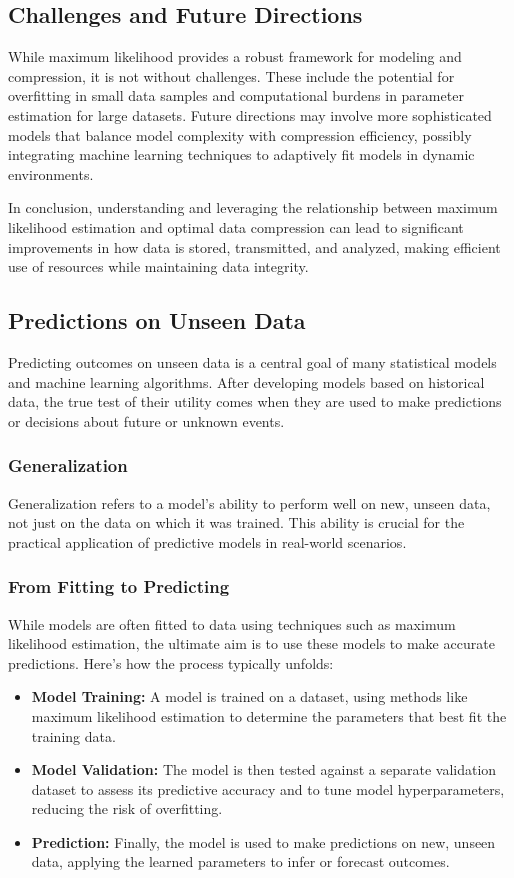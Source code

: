 \subsection{Challenges and Future Directions}
While maximum likelihood provides a robust framework for modeling and compression, it is not without challenges. These include the potential for overfitting in small data samples and computational burdens in parameter estimation for large datasets. Future directions may involve more sophisticated models that balance model complexity with compression efficiency, possibly integrating machine learning techniques to adaptively fit models in dynamic environments.

In conclusion, understanding and leveraging the relationship between maximum likelihood estimation and optimal data compression can lead to significant improvements in how data is stored, transmitted, and analyzed, making efficient use of resources while maintaining data integrity.

\subsection{Predictions on Unseen Data}

Predicting outcomes on unseen data is a central goal of many statistical models and machine learning algorithms. After developing models based on historical data, the true test of their utility comes when they are used to make predictions or decisions about future or unknown events.

\subsubsection{Generalization}
Generalization refers to a model's ability to perform well on new, unseen data, not just on the data on which it was trained. This ability is crucial for the practical application of predictive models in real-world scenarios.

\subsubsection{From Fitting to Predicting}
While models are often fitted to data using techniques such as maximum likelihood estimation, the ultimate aim is to use these models to make accurate predictions. Here’s how the process typically unfolds:
\begin{itemize}
    \item \textbf{Model Training:} A model is trained on a dataset, using methods like maximum likelihood estimation to determine the parameters that best fit the training data.
    \item \textbf{Model Validation:} The model is then tested against a separate validation dataset to assess its predictive accuracy and to tune model hyperparameters, reducing the risk of overfitting.
    \item \textbf{Prediction:} Finally, the model is used to make predictions on new, unseen data, applying the learned parameters to infer or forecast outcomes.
\end{itemize}


